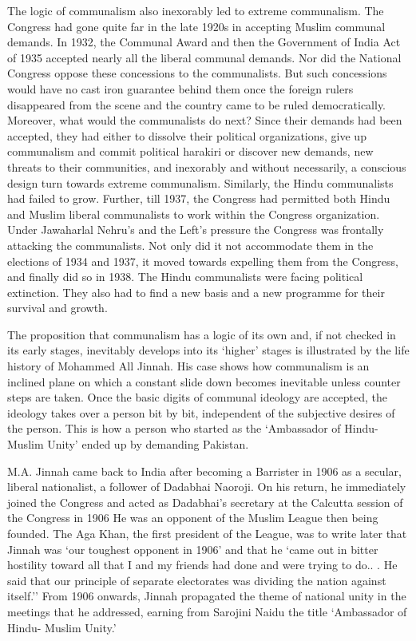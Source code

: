 \begin{multicols}{2}
The logic of communalism also inexorably led to extreme communalism. The Congress had gone quite far in the late 1920s in accepting Muslim communal demands. In 1932, the Communal Award and then the Government of India Act of 1935 accepted nearly all the liberal communal demands. Nor did the National Congress oppose these concessions to the communalists. But such concessions would have no cast iron guarantee behind them once the foreign rulers disappeared from the scene and the country came to be ruled democratically. Moreover, what would the communalists do next? Since their demands had been accepted, they had either to dissolve their political organizations, give up communalism and commit political harakiri or discover new demands, new threats to their communities, and inexorably and without necessarily, a conscious design turn towards extreme communalism. Similarly, the Hindu communalists had failed to grow. Further, till 1937, the Congress had permitted both Hindu and Muslim liberal communalists to work within the Congress organization. Under Jawaharlal Nehru's and the Left's pressure the Congress was frontally attacking the communalists. Not only did it not accommodate them in the elections of 1934 and 1937, it moved towards expelling them from the Congress, and finally did so in 1938. The Hindu communalists were facing political extinction. They also had to find a new basis and a new programme for their survival and growth. 

The proposition that communalism has a logic of its own and, if not checked in its early stages, inevitably develops into its `higher' stages is illustrated by the life history of Mohammed All Jinnah. His case shows how communalism is an inclined plane on which a constant slide down becomes inevitable unless counter steps are taken. Once the basic digits of communal ideology are accepted, the ideology takes over a person bit by bit, independent of the subjective desires of the person. This is how a person who started as the `Ambassador of Hindu-Muslim Unity' ended up by demanding Pakistan. 

M.A. Jinnah came back to India after becoming a Barrister in 1906 as a secular, liberal nationalist, a follower of Dadabhai Naoroji. On his return, he immediately joined the Congress and acted as Dadabhai's secretary at the Calcutta session of the Congress in 1906 He was an opponent of the Muslim League then being founded. The Aga Khan, the first president of the League, was to write later that Jinnah was `our toughest opponent in 1906' and that he `came out in bitter hostility toward all that I and my friends had done and were trying to do.. . He said that our principle of separate electorates was dividing the nation against itself.'' From 1906 onwards, Jinnah propagated the theme of national unity in the meetings that he addressed, earning from Sarojini Naidu the title `Ambassador of Hindu- Muslim Unity.' 


\end{multicols}
